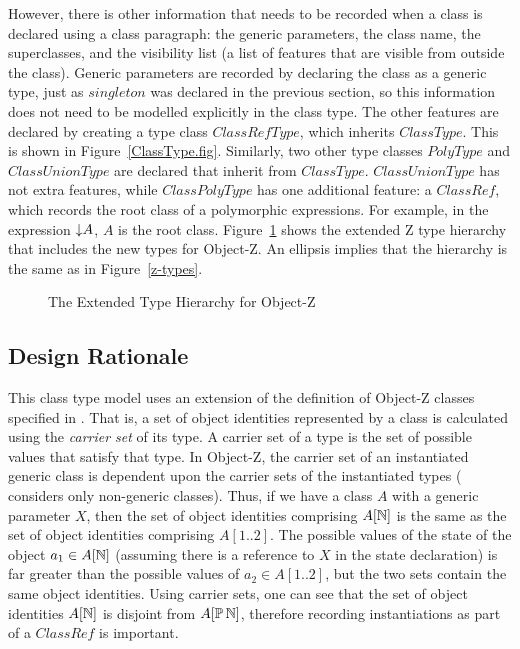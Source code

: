 However, there is other information that needs to be recorded when a
class is declared using a class paragraph: the generic parameters, the
class name, the superclasses, and the visibility list (a list of
features that are visible from outside the class). Generic parameters
are recorded by declaring the class as a generic type, just as
$singleton$ was declared in the previous section, so this information
does not need to be modelled explicitly in the class type. The other
features are declared by creating a type class $ClassRefType$, which
inherits $ClassType$. This is shown in
Figure~\ref{ClassType.fig}. Similarly, two other type classes
$PolyType$ and $ClassUnionType$ are declared that inherit from
$ClassType$. $ClassUnionType$ has not extra features, while
$ClassPolyType$ has one additional feature: a $ClassRef$, which
records the root class of a polymorphic expressions. For example, in
the expression $\mathord\downarrow A$, $A$ is the root class. Figure~\ref{oz-types}
shows the extended Z type hierarchy that includes the new types for
Object-Z. An ellipsis implies that the hierarchy is the same as in
Figure~\ref{z-types}.

\def\epsfsize#1#2{0.7#1}
\begin{figure}
\begin{center}
\end{center}
\caption{The Extended Type Hierarchy for Object-Z}
\label{oz-types}
\end{figure}
\def\epsfsize#1#2{\epsfxsize}

\subsection{Design Rationale}

This class type model uses an extension of the definition of Object-Z
classes specified in \cite{griffiths94}. That is, a set of object
identities represented by a class is calculated using the {\em carrier
set} of its type. A carrier set of a type is the set of possible
values that satisfy that type. In Object-Z, the carrier set of an
instantiated generic class is dependent upon the carrier sets of the
instantiated types (\cite{griffiths94} considers only non-generic
classes). Thus, if we have a class $A$ with a generic parameter $X$,
then the set of object identities comprising $A[{\mathbb N}]$ is the same as
the set of object identities comprising $A[1..2]$. The possible values
of the state of the object $a_1 \in A[{\mathbb N}]$ (assuming there is a
reference to $X$ in the state declaration) is far greater than the
possible values of $a_2 \in A[1..2]$, but the two sets contain the
same object identities. Using carrier sets, one can see that the set
of object identities $A[{\mathbb N}]$ is disjoint from $A[\power
\nat]$, therefore recording instantiations as part of a $ClassRef$
is important.


